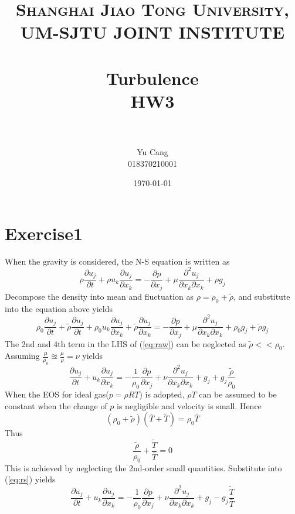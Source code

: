 \documentclass[paper=a4, fontsize=11pt]{scrartcl} %
\title{	
\normalfont \normalsize 
\textsc{Shanghai Jiao Tong University, UM-SJTU JOINT INSTITUTE} \\ [25pt] %
\horrule{0.5pt} \\[0.4cm] %
\huge Turbulence \\ HW3 \\ %
\horrule{2pt} \\[0.5cm] %
}
\author{Yu Cang \\ 018370210001}
\date{\normalsize \today}
\numberwithin{equation}{section} %
\numberwithin{figure}{section} %
\numberwithin{table}{section} %
\begin{document}
\maketitle

\section{Exercise1}
	When the gravity is considered, the N-S equation is written as
	\begin{equation}
		\rho \frac{\partial u_j}{\partial t} + \rho u_k \frac{\partial u_j}{\partial x_k} = -\frac{\partial p}{\partial x_j} + \mu \frac{\partial^2 u_j}{\partial x_k \partial x_k} + \rho g_j
	\end{equation}
	Decompose the density into mean and fluctuation as $\rho = \rho_0 + \tilde{\rho}$, and substitute into the equation above yields
	\begin{equation}\label{eq:raw}
		\rho_0 \frac{\partial u_j}{\partial t} + \tilde{\rho} \frac{\partial u_j}{\partial t} + \rho_0 u_k \frac{\partial u_j}{\partial x_k} + \tilde{\rho} \frac{\partial u_j}{\partial x_k} = -\frac{\partial p}{\partial x_j} + \mu \frac{\partial^2 u_j}{\partial x_k \partial x_k} + \rho_0 g_j + \tilde{\rho} g_j
	\end{equation}
 	The 2nd and 4th term in the LHS of (\ref{eq:raw}) can be neglected as $\tilde{\rho} << \rho_0$. Assuming $\frac{\mu}{\rho_0} \approxeq \frac{\mu}{\rho} = \nu$ yields
 	\begin{equation}\label{eq:rs}
 		\frac{\partial u_j}{\partial t} + u_k \frac{\partial u_j}{\partial x_k} = - \frac{1}{\rho_0} \frac{\partial p}{\partial x_j} + \nu \frac{\partial^2 u_j}{\partial x_k \partial x_k} + g_j + g_j \frac{\tilde{\rho}}{\rho_0} 
 	\end{equation}
 	When the EOS for ideal gas($p = \rho R T$) is adopted, $\rho T$ can be assumed to be constant when the change of $p$ is negligible and velocity is small. Hence
 	\begin{equation}
 		(\rho_0 + \tilde{\rho})(\bar{T} + \tilde{T}) = \rho_0 \bar{T}
 	\end{equation}
 	Thus
 	\begin{equation}
 		\frac{\tilde{\rho}}{\rho_0} + \frac{\tilde{T}}{\bar{T}} = 0
 	\end{equation}
 	This is achieved by neglecting the 2nd-order small quantities.
 	\newpage
 	Substitute into (\ref{eq:rs}) yields
 	\begin{equation}\label{eq:boussineq}
 		\frac{\partial u_j}{\partial t} + u_k \frac{\partial u_j}{\partial x_k} = - \frac{1}{\rho_0} \frac{\partial p}{\partial x_j} + \nu \frac{\partial^2 u_j}{\partial x_k \partial x_k} + g_j - g_j \frac{\tilde{T}}{\bar{T}}
 	\end{equation}
\end{document}

